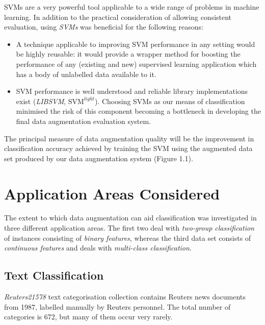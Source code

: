 \documentclass[12pt,twoside,notitlepage,amsart]{report} %
\begin{document}
	{SVMs} are a very powerful tool applicable to a wide range of problems in machine learning. In addition to the practical consideration of allowing consistent evaluation, using \emph{SVMs} was beneficial for the following reasons: 
	
	\begin{itemize} 
	
	\item A technique applicable to improving {SVM} performance in any setting would be highly reusable: it would provide a wrapper method for boosting the performance of any (existing and new) supervised learning application which has a body of unlabelled data available to it.
	
	\item {SVM} performance is well understood and reliable library implementations exist (\emph{LIBSVM}, $ \textrm{SVM} ^{{light}} $). Choosing {SVMs} as our means of classification minimised the risk of this component becoming a bottleneck in developing the final data augmentation evaluation system.
	
	\end{itemize}
	
	The principal measure of data augmentation quality will be the improvement in classification accuracy achieved by training the {SVM} using the {augmented} data set produced by our data augmentation system (Figure 1.1). 
	
	\section{Application Areas Considered}
		
	The extent to which data augmentation can aid classification was investigated in three different application areas. The first two deal with \emph{two-group classification} of instances consisting of \emph{binary features}, whereas the third data set consists of \emph{continuous features} and deals with \emph{multi-class classification}.
	\subsection{Text Classification}
	
	\emph{Reuters21578} text categorisation collection contains Reuters news documents from 1987, labelled manually by Reuters personnel. The total number of categories is 672, but many of them occur very rarely. %
	
\end{document}
